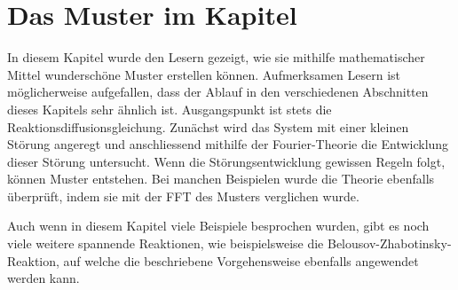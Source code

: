 %
%
%
%
\section{Das Muster im Kapitel}
In diesem Kapitel wurde den Lesern gezeigt, wie sie mithilfe mathematischer Mittel wunderschöne Muster erstellen können.
Aufmerksamen Lesern ist möglicherweise aufgefallen, dass der Ablauf in den verschiedenen Abschnitten dieses Kapitels sehr ähnlich ist.
Ausgangspunkt ist stets die Reaktionsdiffusionsgleichung.
Zunächst wird das System mit einer kleinen Störung angeregt und anschliessend mithilfe der Fourier-Theorie die Entwicklung dieser Störung untersucht.
Wenn die Störungsentwicklung gewissen Regeln folgt, können Muster entstehen.
Bei manchen Beispielen wurde die Theorie ebenfalls überprüft, indem sie mit der FFT des Musters verglichen wurde.

Auch wenn in diesem Kapitel viele Beispiele besprochen wurden, gibt es noch viele weitere spannende Reaktionen, wie beispielsweise die Belousov-Zhabotinsky-Reaktion, auf welche die beschriebene Vorgehensweise ebenfalls angewendet werden kann.
